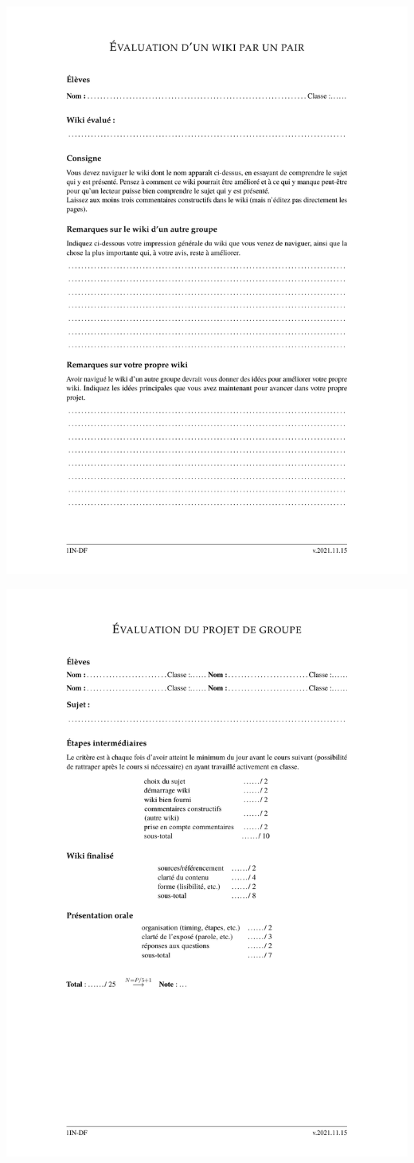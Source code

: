 \documentclass[11pt,bibliography=totoc]{scrartcl}
\begin{document}
\label{annexe:pairs}
\includegraphics[width=.95\textwidth]{annexes/pairs.pdf}

\label{annexe:grille}
\includegraphics[width=.95\textwidth]{annexes/evaluation.pdf}
\end{document}
